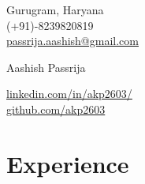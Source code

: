 \documentclass[a4,10pt]{article}
\begin{document}
\begin{center}
    \begin{minipage}[b]{0.24\textwidth}
            \large Gurugram, Haryana \\
            \large (+91)-8239820819 \\
            \large \href{mailto:passrija.aashish@gmail.com}{passrija.aashish@gmail.com} 
    \end{minipage}%
    \begin{minipage}[b]{0.5\textwidth}
            \centering
            {\HUGE Aashish Passrija} \\ %
            \vspace{0.1cm}
    \end{minipage}%
    \begin{minipage}[b]{0.24\textwidth}
            \flushright \large  %
            {\href{https://www.linkedin.com/in/aashish-passrija-649068102/}{linkedin.com/in/akp2603/} } \\
            \href{https://github.com/akp2603}{github.com/akp2603}
    \end{minipage}   
    
\vspace{-0.15cm} 
{\color{UI_blue} \hrulefill}
\end{center}

\section{Experience}

\end{document}
